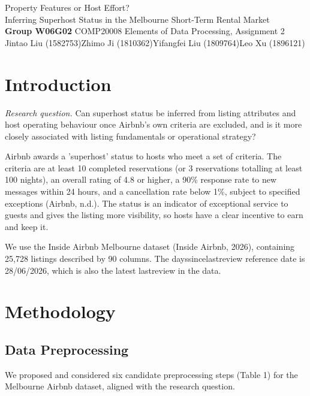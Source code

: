 \documentclass[final,1p,11pt]{elsarticle}
\renewcommand\_{\textunderscore\allowbreak}%
\begin{document}
\begin{center}
{\LARGE Property Features or Host Effort?}\\[4pt]
{\Large Inferring Superhost Status in the Melbourne Short-Term Rental Market}\\[10pt]
{\normalsize\textbf{Group W06G02} \quad COMP20008 Elements of Data Processing, Assignment 2}\\[3pt]
{\normalsize Jintao Liu (1582753)\quad Zhimo Ji (1810362)\quad Yifangfei Liu (1809764)\quad Leo Xu (1896121)}
\end{center}
\vspace{0pt}

\section{Introduction}

\noindent\textit{Research question.} Can superhost status be inferred from listing attributes and host operating behaviour once Airbnb's own criteria are excluded, and is it more closely associated with listing fundamentals or operational strategy?

Airbnb awards a 'superhost' status to hosts who meet a set of criteria. The criteria are at least 10 completed reservations (or 3 reservations totalling at least 100 nights), an overall rating of 4.8 or higher, a 90\% response rate to new messages within 24 hours, and a cancellation rate below 1\%, subject to specified exceptions (Airbnb, n.d.). The status is an indicator of exceptional service to guests and gives the listing more visibility, so hosts have a clear incentive to earn and keep it. 

We use the Inside Airbnb Melbourne dataset (Inside Airbnb, 2026), containing 25,728 listings described by 90 columns. The days\_since\_last\_review reference date is 28/06/2026, which is also the latest last\_review in the data.

\section{Methodology}

\subsection{Data Preprocessing}

We proposed and considered six candidate preprocessing steps (Table 1) for the Melbourne Airbnb dataset, aligned with the research question.
\end{document}
